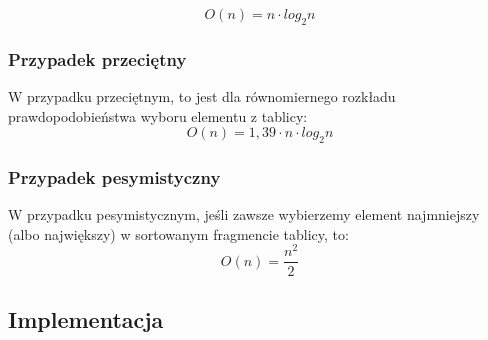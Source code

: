 \documentclass[12pt]{article}
\begin{document}
{ \Large \begin{equation*}
       O(n) = n \cdot log_2 n 
\end{equation*}}
\subsubsection{Przypadek przeciętny}
W przypadku przeciętnym, to jest dla równomiernego rozkładu prawdopodobieństwa wyboru elementu z tablicy: 
{ \Large \begin{equation*}
       O(n) = 1,39 \cdot n \cdot log_2 n 
\end{equation*}}

\subsubsection{Przypadek pesymistyczny}
W przypadku pesymistycznym, jeśli zawsze wybierzemy element najmniejszy (albo największy) w sortowanym fragmencie tablicy, to: 
{\Large \begin{equation*}
       O(n) = \frac{n^2}{2}
\end{equation*}}

\subsection{Implementacja}
\end{document}
